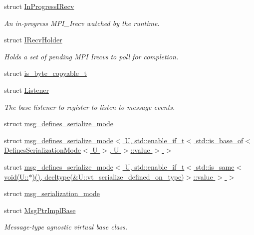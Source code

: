 \begin{DoxyCompactItemize}
struct \hyperlink{structvt_1_1messaging_1_1_in_progress_i_recv}{In\+Progress\+I\+Recv}
\begin{DoxyCompactList}\small\item\em An in-\/progress M\+P\+I\+\_\+\+Irecv watched by the runtime. \end{DoxyCompactList}\item 
struct \hyperlink{structvt_1_1messaging_1_1_i_recv_holder}{I\+Recv\+Holder}
\begin{DoxyCompactList}\small\item\em Holds a set of pending M\+PI Irecvs to poll for completion. \end{DoxyCompactList}\item 
struct \hyperlink{structvt_1_1messaging_1_1is__byte__copyable__t}{is\+\_\+byte\+\_\+copyable\+\_\+t}
\item 
struct \hyperlink{structvt_1_1messaging_1_1_listener}{Listener}
\begin{DoxyCompactList}\small\item\em The base listener to register to listen to message events. \end{DoxyCompactList}\item 
struct \hyperlink{structvt_1_1messaging_1_1msg__defines__serialize__mode}{msg\+\_\+defines\+\_\+serialize\+\_\+mode}
\item 
struct \hyperlink{structvt_1_1messaging_1_1msg__defines__serialize__mode_3_01_u_00_01std_1_1enable__if__t_3_01std_8698c5f7a65cc513c46123d196b4add1}{msg\+\_\+defines\+\_\+serialize\+\_\+mode$<$ U, std\+::enable\+\_\+if\+\_\+t$<$ std\+::is\+\_\+base\+\_\+of$<$ Defines\+Serialization\+Mode$<$ U $>$, U $>$\+::value $>$ $>$}
\item 
struct \hyperlink{structvt_1_1messaging_1_1msg__defines__serialize__mode_3_01_u_00_01std_1_1enable__if__t_3_01std_9ff39ec7a2238fd9d7cc614da26fbe04}{msg\+\_\+defines\+\_\+serialize\+\_\+mode$<$ U, std\+::enable\+\_\+if\+\_\+t$<$ std\+::is\+\_\+same$<$ void(\+U\+::$\ast$)(), decltype(\&\+U\+::vt\+\_\+serialize\+\_\+defined\+\_\+on\+\_\+type)$>$\+::value $>$ $>$}
\item 
struct \hyperlink{structvt_1_1messaging_1_1msg__serialization__mode}{msg\+\_\+serialization\+\_\+mode}
\item 
struct \hyperlink{structvt_1_1messaging_1_1_msg_ptr_impl_base}{Msg\+Ptr\+Impl\+Base}
\begin{DoxyCompactList}\small\item\em Message-\/type agnostic virtual base class. \end{DoxyCompactList}\item 

\end{DoxyCompactItemize}
